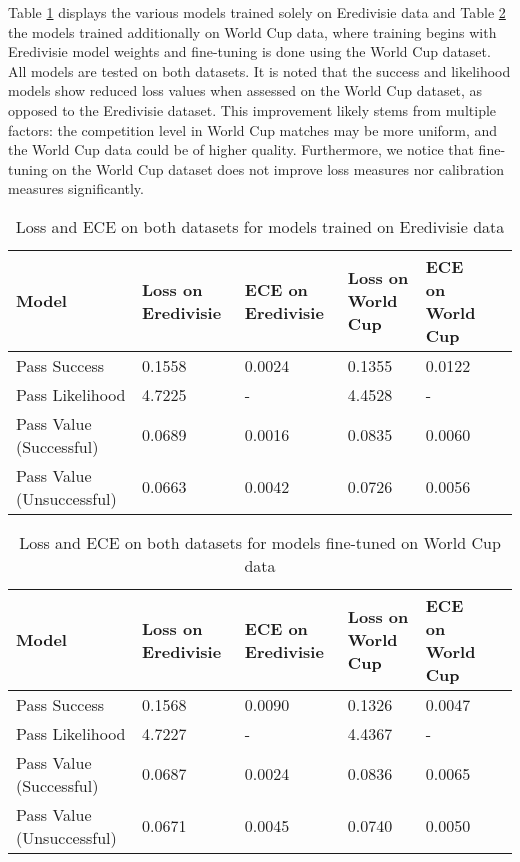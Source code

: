 Table \ref{tab:overall_model_performance_test_eredivisie} displays the various models trained solely on Eredivisie data and Table \ref{tab:overall_model_performance_test_world_cup} the models trained additionally on World Cup data, where training begins with Eredivisie model weights and fine-tuning is done using the World Cup dataset. All models are tested on both datasets. It is noted that the success and likelihood models show reduced loss values when assessed on the World Cup dataset, as opposed to the Eredivisie dataset. This improvement likely stems from multiple factors: the competition level in World Cup matches may be more uniform, and the World Cup data could be of higher quality. Furthermore, we notice that fine-tuning on the World Cup dataset does not improve loss measures nor calibration measures significantly.

\begin{table}[h!]
\centering
\caption{Loss and ECE on both datasets for models trained on Eredivisie data}
\label{tab:overall_model_performance_test_eredivisie}
\scriptsize

\vspace{5mm}
\begin{tabular}{|l|p{1.8cm}|p{1.8cm}|p{1.8cm}|p{1.8cm}|p{1.8cm}|}
\hline
\textbf{Model} & \textbf{Loss on Eredivisie} & \textbf{ECE on Eredivisie} & \textbf{Loss on World Cup} & \textbf{ECE on World Cup} \\ \hline
Pass Success & 0.1558 & 0.0024 & 0.1355 & 0.0122\\ \hline
Pass Likelihood & 4.7225 & - & 4.4528 & - \\ \hline
Pass Value (Successful) & 0.0689 & 0.0016 & 0.0835 & 0.0060 \\ \hline
Pass Value (Unsuccessful) & 0.0663 & 0.0042 & 0.0726 & 0.0056\\ \hline
\end{tabular}
\end{table}

\begin{table}[h!]
\centering
\caption{Loss and ECE on both datasets for models fine-tuned on World Cup data}
\label{tab:overall_model_performance_test_world_cup}
\scriptsize

\vspace{3mm}
\begin{tabular}{|l|p{1.8cm}|p{1.8cm}|p{1.8cm}|p{1.8cm}|p{1.8cm}|}
\hline
\textbf{Model} & \textbf{Loss on Eredivisie} & \textbf{ECE on Eredivisie} & \textbf{Loss on World Cup} & \textbf{ECE on World Cup} \\ \hline
Pass Success & 0.1568 & 0.0090 & 0.1326 & 0.0047 \\ \hline
Pass Likelihood & 4.7227 & - & 4.4367 & - \\ \hline
Pass Value (Successful) & 0.0687 & 0.0024  & 0.0836 & 0.0065  \\ \hline
Pass Value (Unsuccessful) & 0.0671 & 0.0045 & 0.0740 & 0.0050 \\ \hline
\end{tabular}
\end{table}


